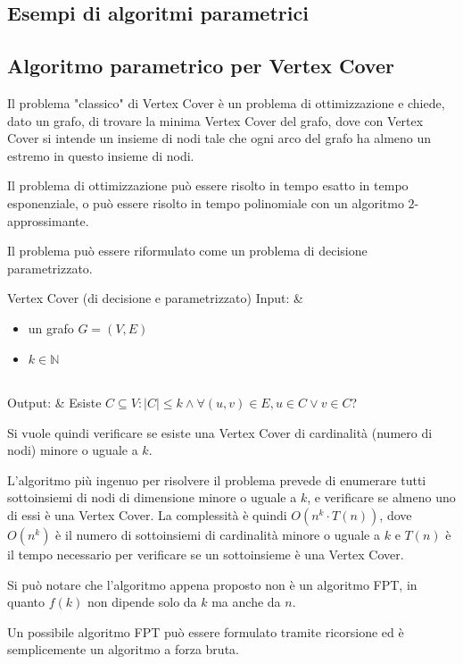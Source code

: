 \subsection{Esempi di algoritmi parametrici}
\subsection*{Algoritmo parametrico per Vertex Cover}
Il problema "classico" di Vertex Cover è un problema di ottimizzazione e
chiede, dato un grafo, di trovare la minima Vertex Cover del grafo, dove con
Vertex Cover si intende un insieme di nodi tale che ogni arco del grafo ha
almeno un estremo in questo insieme di nodi.

Il problema di ottimizzazione può essere risolto in tempo esatto in tempo
esponenziale, o può essere risolto in tempo polinomiale con un algoritmo
$2$-approssimante.

Il problema può essere riformulato come un problema di decisione
parametrizzato.
\begin{problem}[lined]{Vertex Cover (di decisione e parametrizzato)}
    Input: & \begin{minipage}[t]{0.8\linewidth}\begin{itemize}
        \setlength\itemsep{0em}
        \item un grafo $G = (V, E)$
        \item $k \in \mathbb{N}$
    \end{itemize}\end{minipage}\\
    Output: & Esiste $C \subseteq V : |C| \le k \land
    \forall (u, v) \in E, u \in C \lor v \in C$?
\end{problem}
Si vuole quindi verificare se esiste una Vertex Cover di cardinalità
(numero di nodi) minore o uguale a $k$.

L'algoritmo più ingenuo per risolvere il problema prevede di enumerare
tutti sottoinsiemi di nodi di dimensione minore o uguale a $k$, e
verificare se almeno uno di essi è una Vertex Cover.
La complessità è quindi $O(n^k \cdot T(n))$, dove $O(n^k)$ è il numero
di sottoinsiemi di cardinalità minore o uguale a $k$ e $T(n)$ è il tempo
necessario per verificare se un sottoinsieme è una Vertex Cover.

Si può notare che l'algoritmo appena proposto non è un algoritmo FPT,
in quanto $f(k)$ non dipende solo da $k$ ma anche da $n$.

Un possibile algoritmo FPT può essere formulato tramite ricorsione ed è
semplicemente un algoritmo a forza bruta.

